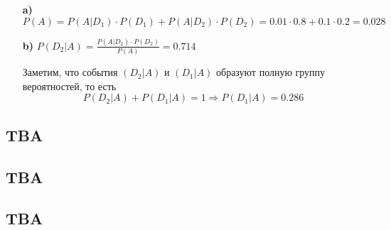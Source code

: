 \documentclass{article}
\begin{document}
\begin{enumerate}
    \item[\textbf{a)}] $P(A)=P(A|D_1)\cdot P(D_1)+P(A|D_2)\cdot P(D_2)=0.01\cdot0.8+0.1\cdot0.2=0.028$
    \item[\textbf{b)}] $P(D_2|A)=\displaystyle\frac{P(A|D_2)\cdot P(D_2)}{P(A)}=0.714$

    Заметим, что события $(D_2|A)$ и $(D_1|A)$ образуют полную группу вероятностей, то есть $$P(D_2|A)+P(D_1|A)=1\Longrightarrow P(D_1|A)=0.286$$
\end{enumerate}

\subsection{TBA}
\subsection{TBA}
\subsection{TBA}
\end{document}

